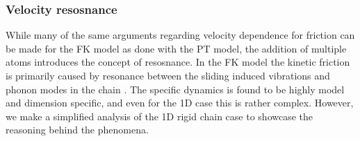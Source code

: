 





\subsubsection{Velocity resosnance} %
While many of the same arguments regarding velocity dependence for friction can be made for the \acrshort{FK} model as done with the \acrshort{PT} model, the addition of multiple atoms introduces the concept of resosnance. In the \acrshort{FK} model the kinetic friction is primarily caused by resonance between the sliding induced vibrations and phonon modes in the chain \cite{FK2D}. The specific dynamics is found to be highly model and dimension specific, and even for the 1D case this is rather complex. However, we make a simplified analysis of the 1D rigid chain case to showcase the reasoning behind the phenomena.


